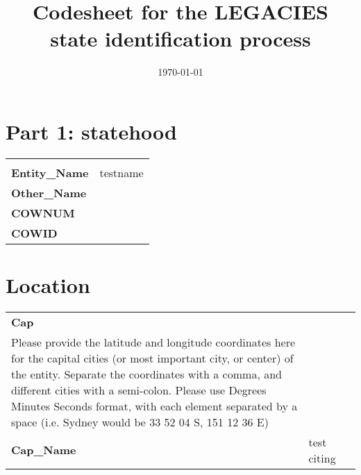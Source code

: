 \documentclass[11pt]{article}
\date{\today}
\title{Codesheet for the LEGACIES state identification process}
\begin{document}
\maketitle
\tableofcontents


\section{Part 1: statehood}
\label{sec:orgbb6a1dd}

\begin{center}
\begin{tabular}{ll}
\hline
 & \\
\textbf{Entity\_Nam​e} & testname\\
\hline
\textbf{Other\_Name} & \\
\hline
\textbf{COWNUM} & \\
\hline
\textbf{COWID} & \\
\hline
\end{tabular}
\end{center}

\section{Location}
\label{sec:org9a5cc90}

\begin{center}
\begin{tabular}{lll}
\hline
\textbf{Cap} &  & \\
Please provide the latitude and longitude coordinates here for the capital cities (or most important city, or center) of the entity. Separate the coordinates with a comma, and different cities with a semi-colon. Please use Degrees Minutes Seconds format, with each element separated by a space (i.e. Sydney would be 33 52 04 S, 151 12 36 E) &  & \\
\textbf{Cap\_Name} & test citing\citep{Arrowsmith1802} & \\
\end{tabular}
\end{center}
\end{document}
